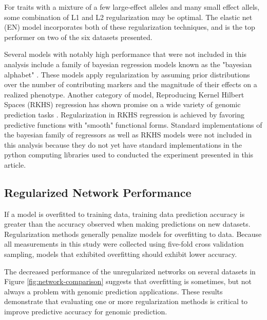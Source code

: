 For traits with a mixture of a few large-effect alleles and many small effect allels, some combination of 
L1 and L2 regularization may be optimal. The elastic net (EN) model incorporates both of these regularization
techniques, and is the top performer on two of the six datasets presented.

Several models with notably high performance that were not included in this analysis include a
family of bayesian regression models known as the "bayesian alphabet" \citep{gianola2009}. These
models apply regularization by assuming prior distributions over the number of contributing markers
and the magnitude of their effects on a realized phenotype. Another category of model, Reproducing 
Kernel Hilbert Spaces (RKHS) regression has shown promise on a wide variety of genomic 
prediction tasks \citep{heslot2012, gianola2008}. Regularization in RKHS regression is achieved
by favoring predictive functions with "smooth" functional forms. Standard implementations
of the bayesian family of regressors as well as RKHS models were not included in this analysis
because they do not yet have standard implementations in the python computing libraries used 
to conducted the experiment presented in this article.

\ifdefined\showtablesandfigures
\fi

\subsection*{Regularized Network Performance}

If a model is overfitted to training data, training data prediction accuracy is greater than 
the accuracy observed when making predictions on new datasets. Regularization methods
generally penalize models for overfitting to data. Because all measurements in this study 
were collected using five-fold cross validation sampling, models that exhibited overfitting 
should exhibit lower accuracy. 

The decreased performance of the unregularized networks on several datasets in Figure 
\ref{fig:network-comparison} suggests that overfitting is sometimes, but not always
a problem with genomic prediction applications. These results demonstrate that 
evaluating one or more regularization methods is critical to improve predictive accuracy for 
genomic prediction.

\ifdefined\showtablesandfigures
\fi

